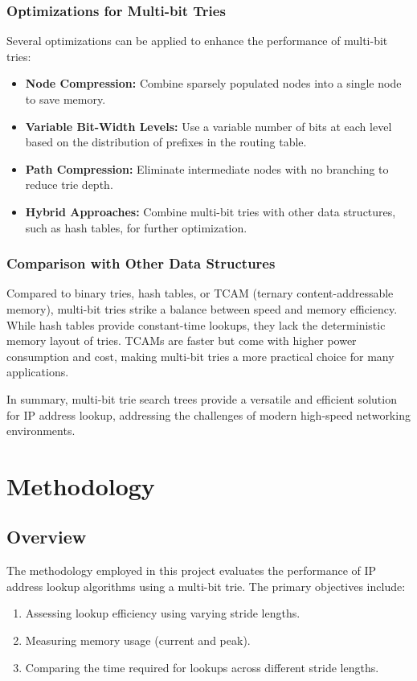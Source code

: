 \documentclass[12pt	]{article}
\begin{document}
\subsubsection{Optimizations for Multi-bit Tries}
Several optimizations can be applied to enhance the performance of multi-bit tries:
\begin{itemize}
	\item \textbf{Node Compression:} Combine sparsely populated nodes into a single node to save memory.
	\item \textbf{Variable Bit-Width Levels:} Use a variable number of bits at each level based on the distribution of prefixes in the routing table.
	\item \textbf{Path Compression:} Eliminate intermediate nodes with no branching to reduce trie depth.
	\item \textbf{Hybrid Approaches:} Combine multi-bit tries with other data structures, such as hash tables, for further optimization.
\end{itemize}

\subsubsection{Comparison with Other Data Structures}
Compared to binary tries, hash tables, or TCAM (ternary content-addressable memory), multi-bit tries strike a balance between speed and memory efficiency. While hash tables provide constant-time lookups, they lack the deterministic memory layout of tries. TCAMs are faster but come with higher power consumption and cost, making multi-bit tries a more practical choice for many applications.

In summary, multi-bit trie search trees provide a versatile and efficient solution for IP address lookup, addressing the challenges of modern high-speed networking environments.



\section{Methodology}

\subsection{Overview}
The methodology employed in this project evaluates the performance of IP address lookup algorithms using a multi-bit trie. The primary objectives include:
\begin{enumerate}
	\item Assessing lookup efficiency using varying stride lengths.
	\item Measuring memory usage (current and peak).
	\item Comparing the time required for lookups across different stride lengths.
\end{enumerate}
\end{document}
